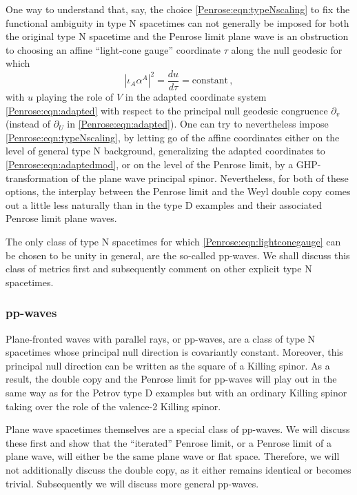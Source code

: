 One way to understand that, say, the choice \eqref{Penrose:eqn:typeNscaling} to fix the functional ambiguity in type N spacetimes can not generally be imposed for both the original type N spacetime and the Penrose limit plane wave is an obstruction to choosing an affine ``light-cone gauge'' coordinate $\tau$ along the null geodesic for which
\begin{equation}\label{Penrose:eqn:lightconegauge}
|\iota_A \alpha^A|^2 = \frac{d u}{d \tau} = \text{constant} \, ,
\end{equation}
with $u$ playing the role of $V$ in the adapted coordinate system \eqref{Penrose:eqn:adapted} with respect to the principal
null geodesic congruence $\partial_v$ (instead of $\partial_U$ in \eqref{Penrose:eqn:adapted}). One can try to nevertheless
impose \eqref{Penrose:eqn:typeNscaling}, by letting go of the affine coordinates either on the level of general type N
background, generalizing the adapted coordinates to \eqref{Penrose:eqn:adaptedmod}, or on the level of the Penrose limit,
by a GHP-transformation of the plane wave principal spinor. Nevertheless, for both of these options, the interplay
between the Penrose limit and the Weyl double copy comes out a little less naturally than in the type D examples and their associated Penrose limit plane waves.

The only class of type N spacetimes for which \eqref{Penrose:eqn:lightconegauge} can be chosen to be unity in general, are the so-called pp-waves. We shall discuss this class of metrics first and subsequently comment on other explicit type N spacetimes. 

\subsubsection{pp-waves} \label{Penrose:sec:ppwaves}

Plane-fronted waves with parallel rays, or pp-waves, are a class of type N spacetimes whose principal null direction is covariantly constant. Moreover, this principal null direction can be written as the square of a Killing spinor. As a result, the double copy and the Penrose limit for pp-waves will play out in the same way as for the Petrov type D examples but with an ordinary Killing spinor taking over the role of the valence-2 Killing spinor. 

Plane wave spacetimes themselves are a special class of pp-waves. We will discuss these first and show that the ``iterated'' Penrose limit, or a Penrose limit of a plane wave, will either be the same plane wave or flat space. Therefore, we will not additionally discuss the double copy, as it either remains identical or becomes trivial. Subsequently we will discuss more general pp-waves.

